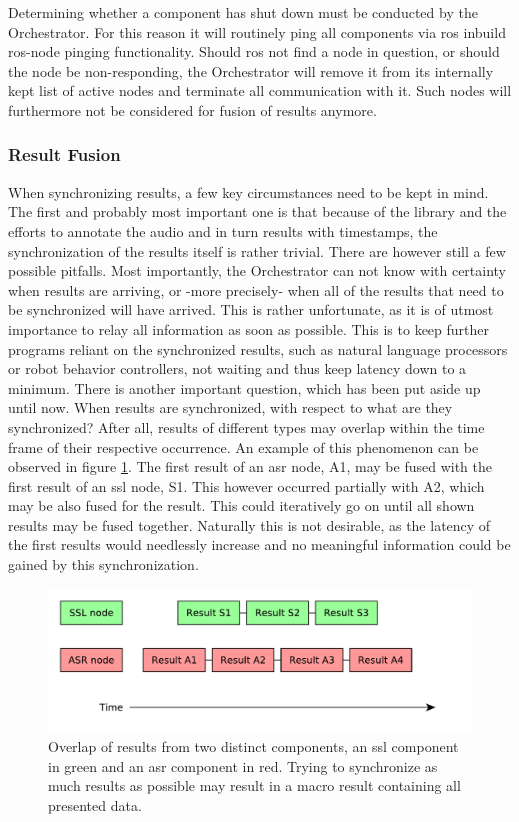 Determining whether a component has shut down must be conducted by the Orchestrator.
For this reason it will routinely ping all components via \gls{ros} inbuild \gls{ros}-node pinging functionality.
Should \gls{ros} not find a node in question, or should the node be non-responding, the Orchestrator will remove it from its internally kept list of active nodes and terminate all communication with it.
Such nodes will furthermore not be considered for fusion of results anymore. 

\subsubsection{Result Fusion}

When synchronizing results, a few key circumstances need to be kept in mind.
The first and probably most important one is that because of the library and the efforts to annotate the audio and in turn results with timestamps, the synchronization of the results itself is rather trivial.
There are however still a few possible pitfalls.
Most importantly, the Orchestrator can not know with certainty when results are arriving, or -more precisely- when all of the results that need to be synchronized will have arrived.
This is rather unfortunate, as it is of utmost importance to relay all information as soon as possible.
This is to keep further programs reliant on the synchronized results, such as natural language processors or robot behavior controllers, not waiting and thus keep latency down to a minimum.
There is another important question, which has been put aside up until now.
When results are synchronized, with respect to what are they synchronized?
After all, results of different types may overlap within the time frame of their respective occurrence.
An example of this phenomenon can be observed in figure \ref{pic:main:orc:result_overlap}.
The first result of an \gls{asr} node, A1, may be fused with the first result of an \gls{ssl} node, S1.
This however occurred partially with A2, which may be also fused for the result.
This could iteratively go on until all shown results may be fused together.
Naturally this is not desirable, as the latency of the first results would needlessly increase and no meaningful information could be gained by this synchronization.

\begin{figure}[]
	\centering
	\includegraphics[width=\textwidth]{diagrams/main_orc_result_overlap.pdf}
	\caption{Overlap of results from two distinct components, an \gls{ssl} component in green and an \gls{asr} component in red.
		Trying to synchronize as much results as possible may result in a macro result containing all presented data.}
	\label{pic:main:orc:result_overlap}
\end{figure}


